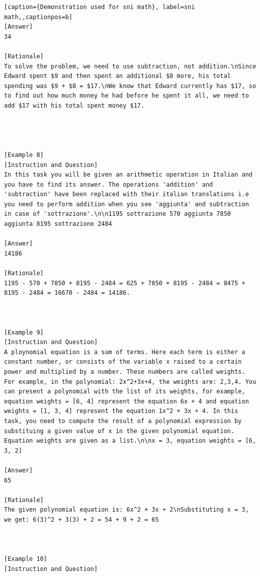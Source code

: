 \begin{lstlisting}[caption={Demonstration used for sni math}, label=sni math,,captionpos=b]
[Answer]
34

[Rationale]
To solve the problem, we need to use subtraction, not addition.\nSince Edward spent $9 and then spent an additional $8 more, his total spending was $9 + $8 = $17.\nWe know that Edward currently has $17, so to find out how much money he had before he spent it all, we need to add $17 with his total spent money $17.




[Example 8]
[Instruction and Question]
In this task you will be given an arithmetic operation in Italian and you have to find its answer. The operations 'addition' and 'subtraction' have been replaced with their italian translations i.e you need to perform addition when you see 'aggiunta' and subtraction in case of 'sottrazione'.\n\n1195 sottrazione 570 aggiunta 7850 aggiunta 8195 sottrazione 2484

[Answer]
14186

[Rationale]
1195 - 570 + 7850 + 8195 - 2484 = 625 + 7850 + 8195 - 2484 = 8475 + 8195 - 2484 = 16670 - 2484 = 14186.



[Example 9]
[Instruction and Question]
A ploynomial equation is a sum of terms. Here each term is either a constant number, or consists of the variable x raised to a certain power and multiplied by a number. These numbers are called weights. For example, in the polynomial: 2x^2+3x+4, the weights are: 2,3,4. You can present a polynomial with the list of its weights, for example, equation weights = [6, 4] represent the equation 6x + 4 and equation weights = [1, 3, 4] represent the equation 1x^2 + 3x + 4. In this task, you need to compute the result of a polynomial expression by substituing a given value of x in the given polynomial equation. Equation weights are given as a list.\n\nx = 3, equation weights = [6, 3, 2]

[Answer]
65

[Rationale]
The given polynomial equation is: 6x^2 + 3x + 2\nSubstituting x = 3, we get: 6(3)^2 + 3(3) + 2 = 54 + 9 + 2 = 65



[Example 10]
[Instruction and Question]

    \end{lstlisting}
    




